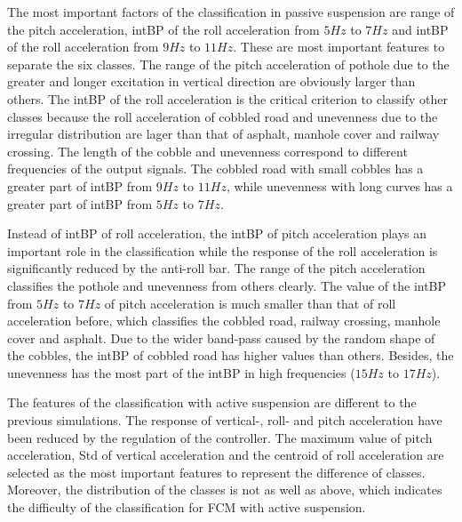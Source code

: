 The most important factors of the classification in passive suspension are range of the pitch acceleration, \ac{intBP} of the roll acceleration from $5Hz$ to $7Hz$ and \ac{intBP} of the roll acceleration from $9Hz$ to $11Hz$. 
%
These are most important features to separate the six classes.
%
The range of the pitch acceleration of pothole due to the greater and longer excitation in vertical direction are obviously larger than others.
%
The \ac{intBP} of the roll acceleration is the critical criterion to classify other classes because the roll acceleration of cobbled road and unevenness due to the irregular distribution are lager than that of asphalt, manhole cover and railway crossing.
%
The length of the cobble and unevenness correspond to different frequencies of the output signals.
%
The cobbled road with small cobbles has a greater part of \ac{intBP} from $9Hz$ to $11Hz$, while unevenness with long curves has a greater part of \ac{intBP} from $5Hz$ to $7Hz$.

Instead of \ac{intBP} of roll acceleration, the \ac{intBP} of pitch acceleration plays an important role in the classification while the response of the roll acceleration is significantly reduced by the anti-roll bar.
%
The range of the pitch acceleration classifies the pothole and unevenness from others clearly.
%
The value of the \ac{intBP} from $5Hz$ to $7Hz$ of pitch acceleration is much smaller than that of roll acceleration before, which classifies the cobbled road, railway crossing, manhole cover and asphalt.
%
Due to the wider band-pass caused by the random shape of the cobbles, the \ac{intBP} of cobbled road has higher values than others.
%
Besides, the unevenness has the most part of the \ac{intBP} in high frequencies ($15Hz$ to $17Hz$).

The features of the classification with active suspension are different to the previous simulations.
%
The response of vertical-, roll- and pitch acceleration have been reduced by the regulation of the controller.
%
The maximum value of pitch acceleration, \ac{Std} of vertical acceleration and the centroid of roll acceleration are selected as the most important features to represent the difference of classes.
%
Moreover, the distribution of the classes is not as well as above, which indicates the difficulty of the classification for \ac{FCM} with active suspension.


